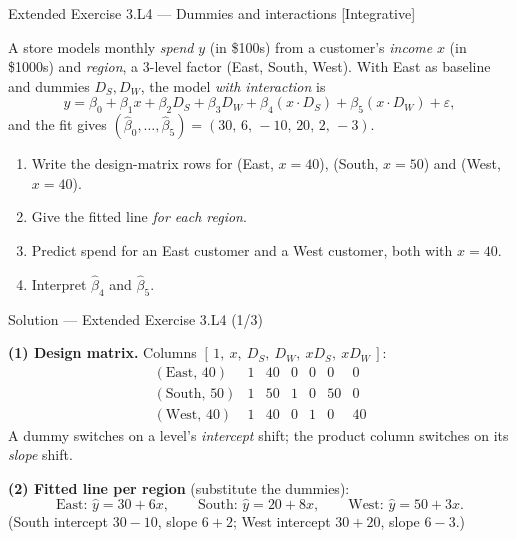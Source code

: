 \documentclass[aspectratio=169,11pt]{beamer}
\begin{document}
\begin{frame}{Extended Exercise 3.L4 --- Dummies and interactions [Integrative]}
  \begin{longexercise}
    A store models monthly \emph{spend} $y$ (in \$100s) from a customer's
    \emph{income} $x$ (in \$1000s) and \emph{region}, a 3-level factor
    (East, South, West). With East as baseline and dummies $D_S,D_W$, the
    model \emph{with interaction} is
    \[
      y=\beta_0+\beta_1 x+\beta_2 D_S+\beta_3 D_W
        +\beta_4 (x\!\cdot\!D_S)+\beta_5 (x\!\cdot\!D_W)+\varepsilon,
    \]
    and the fit gives $(\hat\beta_0,\dots,\hat\beta_5)=(30,\,6,\,-10,\,20,\,2,\,-3)$.
    \begin{enumerate}
      \item Write the design-matrix rows for (East, $x{=}40$),
            (South, $x{=}50$) and (West, $x{=}40$).
      \item Give the fitted line \emph{for each region}.
      \item Predict spend for an East customer and a West customer, both
            with $x{=}40$.
      \item Interpret $\hat\beta_4$ and $\hat\beta_5$.
    \end{enumerate}
  \end{longexercise}
\end{frame}

\begin{frame}{Solution --- Extended Exercise 3.L4 (1/3)}
  \begin{solutionbox}
    \textbf{(1) Design matrix.} Columns
    $[\,1,\ x,\ D_S,\ D_W,\ xD_S,\ xD_W\,]$:
    \[
      \begin{array}{l|cccccc}
        (\text{East},\,40)  & 1 & 40 & 0 & 0 & 0  & 0\\
        (\text{South},\,50) & 1 & 50 & 1 & 0 & 50 & 0\\
        (\text{West},\,40)  & 1 & 40 & 0 & 1 & 0  & 40
      \end{array}
    \]
    A dummy switches on a level's \emph{intercept} shift; the product
    column switches on its \emph{slope} shift.

    \textbf{(2) Fitted line per region} (substitute the dummies):
    \[
      \text{East: } \hat y = 30 + 6x,\qquad
      \text{South: } \hat y = 20 + 8x,\qquad
      \text{West: } \hat y = 50 + 3x.
    \]
    (South intercept $30-10$, slope $6+2$; West intercept $30+20$,
    slope $6-3$.)
  \end{solutionbox}
\end{frame}
\end{document}
